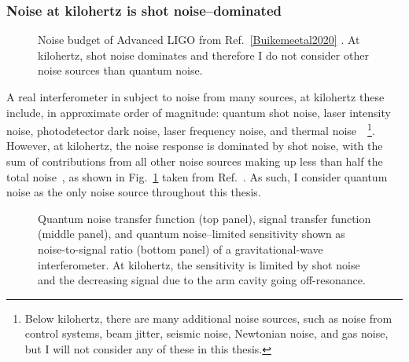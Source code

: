 \subsubsection{Noise at kilohertz is shot noise--dominated}

\begin{figure}
	\centering
	\caption{Noise budget of Advanced LIGO from Ref.~\ref{Buikemeetal2020} . At kilohertz, shot noise dominates and therefore I do not consider other noise sources than quantum noise.}
	\label{fig:Buikemeetal2020_LIGO_noise_budget}
\end{figure}


A real interferometer in subject to noise from many sources, at kilohertz these include, in approximate order of magnitude: quantum shot noise, laser intensity noise, photodetector dark noise, laser frequency noise, and thermal noise~\cite{Buikemeetal2020}~\footnote{Below kilohertz, there are many additional noise sources, such as noise from control systems, beam jitter, seismic noise, Newtonian noise, and gas noise, but I will not consider any of these in this thesis.}. However, at kilohertz, the noise response is dominated by shot noise, with the sum of contributions from all other noise sources making up less than half the total noise~\cite{}, as shown in Fig.~\ref{fig:Buikemeetal2020_LIGO_noise_budget} taken from Ref.~\cite{Buikemeetal2020}. As such, I consider quantum noise as the only noise source throughout this thesis.

\begin{figure}
	\centering
	\caption{Quantum noise transfer function (top panel), signal transfer function (middle panel), and quantum noise--limited sensitivity shown as noise-to-signal ratio (bottom panel) of a gravitational-wave interferometer. At kilohertz, the sensitivity is limited by shot noise and the decreasing signal due to the arm cavity going off-resonance.}
	\label{fig:simplified_sensitivity}
\end{figure}

